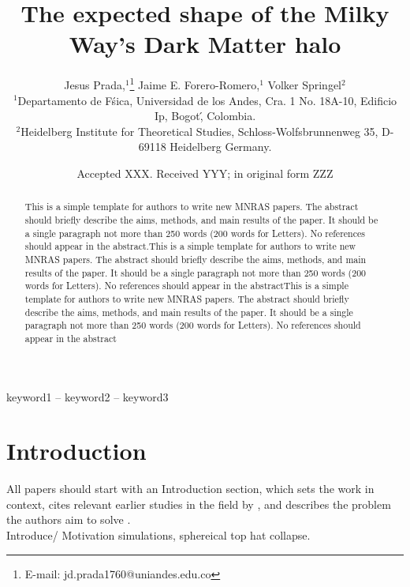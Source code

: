 \documentclass[a4paper,fleqn,usenatbib]{mnras}
\title[Title]{The expected shape of the Milky Way's Dark Matter halo}
\author[Jesus Prada,  Jaime E. Forero-Romero, Volker Springel ]{
Jesus Prada,$^{1}$\thanks{E-mail: jd.prada1760@uniandes.edu.co}
Jaime E. Forero-Romero,$^{1}$
Volker Springel$^{2}$
\\
$^{1}$Departamento de F\'sica, Universidad de los Andes, Cra. 1 No.
18A-10, Edificio Ip, Bogot\', Colombia.\\
$^{2}$Heidelberg Institute for Theoretical Studies, Schloss-Wolfsbrunnenweg 35, D-69118 Heidelberg
Germany.\\
}
\date{Accepted XXX. Received YYY; in original form ZZZ}
\begin{document}
\label{firstpage}
\pagerange{\pageref{firstpage}--\pageref{lastpage}}
\maketitle

\begin{abstract}
This is a simple template for authors to write new MNRAS papers.
The abstract should briefly describe the aims, methods, and main results of the paper.
It should be a single paragraph not more than 250 words (200 words for Letters).
No references should appear in the abstract.This is a simple template for authors to write new MNRAS papers.
The abstract should briefly describe the aims, methods, and main results of the paper.
It should be a single paragraph not more than 250 words (200 words for Letters).
No references should appear in the abstractThis is a simple template for authors to write new MNRAS papers.
The abstract should briefly describe the aims, methods, and main results of the paper.
It should be a single paragraph not more than 250 words (200 words for Letters).
No references should appear in the abstract
\end{abstract}

\begin{keywords}
keyword1 -- keyword2 -- keyword3
\end{keywords}



\section{Introduction}


All papers should start with an Introduction section, which sets the work
in context, cites relevant earlier studies in the field by \citet{Others2013},
and describes the problem the authors aim to solve \citep[e.g.][]{Author2012}.\\

Introduce/ Motivation simulations, sphereical top hat collapse.\\
\end{document}
